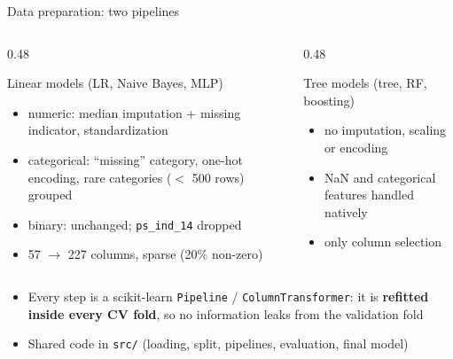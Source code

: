 \documentclass[aspectratio=169,11pt]{beamer}
\newcommand{\feat}[1]{\texttt{\small #1}}   %
\newcommand{\hl}[1]{\textcolor{accent}{\textbf{#1}}}
\begin{document}
\begin{frame}{Data preparation: two pipelines}
  \begin{columns}[T]
    \begin{column}{0.48\textwidth}
      \begin{block}{Linear models (LR, Naive Bayes, MLP)}
        \small
        \begin{itemize}
          \item numeric: median imputation + missing indicator, standardization
          \item categorical: ``missing'' category, one-hot encoding, rare categories ($<$ 500 rows) grouped
          \item binary: unchanged; \feat{ps\_ind\_14} dropped
          \item 57 $\rightarrow$ 227 columns, sparse (20\% non-zero)
        \end{itemize}
      \end{block}
    \end{column}
    \begin{column}{0.48\textwidth}
      \begin{block}{Tree models (tree, RF, boosting)}
        \small
        \begin{itemize}
          \item no imputation, scaling or encoding
          \item NaN and categorical features handled natively
          \item only column selection
        \end{itemize}
      \end{block}
    \end{column}
  \end{columns}
  \vspace{0.2cm}
  \small
  \begin{itemize}
    \item Every step is a scikit-learn \texttt{Pipeline} / \texttt{ColumnTransformer}: it is \hl{refitted inside
          every CV fold}, so no information leaks from the validation fold
    \item Shared code in \texttt{src/} (loading, split, pipelines, evaluation, final model)
  \end{itemize}
\end{frame}
\end{document}
